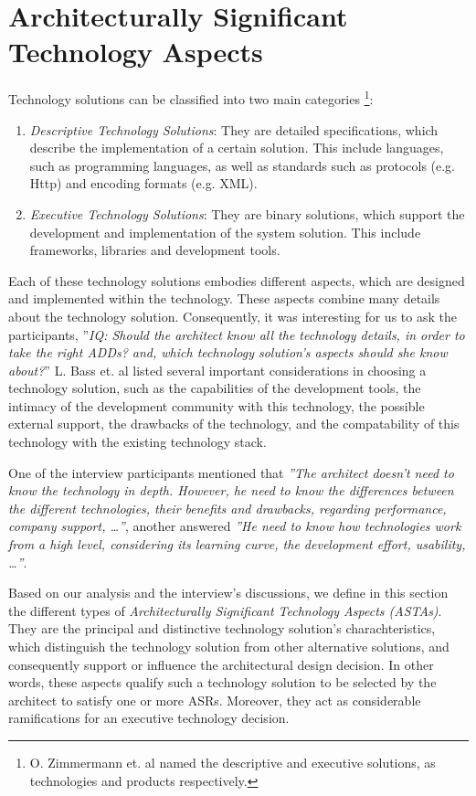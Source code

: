 \documentclass[conference]{IEEEtran}
\begin{document}
\section{Architecturally Significant Technology Aspects}
\label{sec:aspects}
Technology solutions can be classified into two main categories
\cite{Zimmermann2009}\footnote{O. Zimmermann et. al named the descriptive and
executive solutions, as technologies and products respectively.}:
\begin{enumerate}
\item \textit{Descriptive Technology Solutions}: They are detailed
specifications, which describe the implementation of a certain solution. This
include languages, such as programming languages, as well as standards such as
protocols (e.g. Http) and encoding formats (e.g. XML).
\item \textit{Executive Technology Solutions}:
They are binary solutions, which support the development and implementation of
the system solution. This include frameworks, libraries and development
tools.
\end{enumerate}
Each of these technology solutions embodies different aspects, which are
designed and implemented within the technology. These aspects combine many
details about the technology solution. Consequently, it was interesting for us
to ask the participants, ''\textit{IQ: Should the architect know all the
technology details, in order to take the right ADDs? and, which technology solution's aspects should
she know about?}'' L. Bass et. al \cite{BassBook2012} listed
several important considerations in choosing a technology solution, such as the capabilities of
the development tools, the intimacy of the development community with this
technology, the possible external support, the drawbacks of the technology, and
the compatability of this technology with the existing technology stack.

One of the interview participants mentioned that \textit{''The architect
doesn't need to know the technology in depth. However, he need to know the
differences between the different technologies, their benefits and drawbacks,
regarding performance, company support, \ldots''}, another answered \textit{''He
need to know how technologies work from a high level, considering its learning curve,
the development effort, usability, \ldots''}.

Based on our analysis and the interview's discussions, we define in this section
the different types of \textit{Architecturally Significant Technology Aspects
(ASTAs)}. They are the principal and distinctive technology solution's
charachteristics, which distinguish the technology solution from other
alternative solutions, and consequently support or influence the architectural
design decision. In other words, these aspects qualify such a technology
solution to be selected by the architect to satisfy one or more ASRs. Moreover,
they act as considerable ramifications for an executive technology decision.
\end{document}
